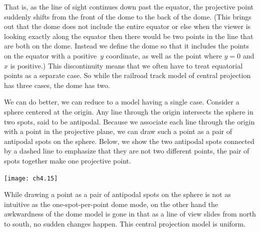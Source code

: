 That is, as
the line of sight continues down past the equator, the projective point
suddenly shifts from the front of the dome to the back of the dome.
(This brings out that the dome does not include the entire equator
or else
when the viewer is looking exactly along the equator then there would be 
two points in the line that are both on the dome. 
Instead we define the dome so that it includes the
points on the equator with a positive~$y$ coordinate, as well as the point
where $y=0$ and $x$ is positive.)
This discontinuity means that
we often have to treat equatorial points as a separate case.
So while the railroad track model of central projection
has three cases, the dome has two.

We can do better, we can reduce to a model having a single case.
Consider a sphere centered at the origin.
Any line through the origin intersects the sphere in two spots, said to be
antipodal.
Because we associate each line through the origin 
with a point in the projective 
plane, we can draw such a point as a pair of antipodal spots on the sphere. 
Below, we show the two antipodal spots connected by a dashed line
to emphasize that they are not two 
different points, the pair of spots together make one projective point.
\begin{center}
  \texttt{[image: ch4.15]}
\end{center}
While drawing a point as a pair of antipodal 
spots on the sphere is not as intuitive as the one-spot-per-point dome mode,
on the other hand
the awkwardness of the dome model is gone in that 
as a line of view slides from north to south, 
no sudden changes happen.
This central projection model is uniform.

